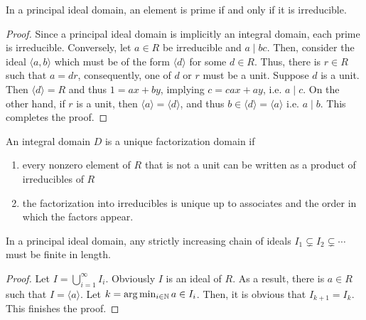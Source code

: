\begin{theorem}
    In a principal ideal domain, an element is prime if and only if it is irreducible.
\end{theorem}
\begin{proof}
    Since a principal ideal domain is implicitly an integral domain, each prime is irreducible. Conversely, let $a\in R$ be irreducible and $a\mid bc$. Then, consider the ideal $\langle a,b\rangle$ which must be of the form $\langle d\rangle$ for some $d\in R$. Thus, there is $r\in R$ such that $a = dr$, consequently, one of $d$ or $r$ must be a unit. Suppose $d$ is a unit. Then $\langle d\rangle = R$ and thus $1 = ax + by$, implying $c = cax + ay$, i.e. $a\mid c$. On the other hand, if $r$ is a unit, then $\langle a\rangle = \langle d\rangle$, and thus $b\in\langle d\rangle = \langle a\rangle$ i.e. $a\mid b$. This completes the proof.
\end{proof}

\begin{definition}
    An integral domain $D$ is a unique factorization domain if 
    \begin{enumerate}
        \item every nonzero element of $R$ that is not a unit can be written as a product of irreducibles of $R$ 
        \item the factorization into irreducibles is unique up to associates and the order in which the factors appear.
    \end{enumerate}
\end{definition}

\begin{lemma}
    In a principal ideal domain, any strictly increasing chain of ideals $I_1\subsetneq I_2\subsetneq\cdots$ must be finite in length.
\end{lemma}
\begin{proof}
    Let $I = \bigcup_{i = 1}^\infty I_i$. Obviously $I$ is an ideal of $R$. As a result, there is $a\in R$ such that $I = \langle a\rangle$. Let $k = \arg\min_{i\in\mathbb{N}}a\in I_i$. Then, it is obvious that $I_{k + 1} = I_k$. This finishes the proof.
\end{proof}

